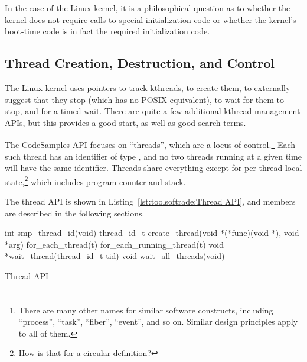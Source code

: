In the case of the Linux kernel, it is a philosophical question as to
whether the kernel does not require calls to special initialization
code or whether the kernel's boot-time code is in fact the required
initialization code.

\subsection{Thread Creation, Destruction, and Control}
\label{sec:toolsoftrade:Thread Creation, Destruction, and Control}

The Linux kernel uses
 pointers to track kthreads,
 to create them,
 to externally suggest that they stop
(which has no POSIX equivalent),
 to wait for them to stop, and
 for a timed wait.
There are quite a few additional kthread-management APIs, but this
provides a good start, as well as good search terms.

The CodeSamples API focuses on ``threads'', which are a locus of
control.\footnote{
	There are many other names for similar software constructs, including
	``process'', ``task'', ``fiber'', ``event'', and so on.
	Similar design principles apply to all of them.}
Each such thread has an identifier of type ,
and no two threads running at a given time will have the same
identifier.
Threads share everything except for per-thread local state,\footnote{
	How is that for a circular definition?}
which includes program counter and stack.

The thread API is shown in
Listing~\ref{lst:toolsoftrade:Thread API}, and members are described in the
following sections.

\begin{listing}[tbp]
\begin{VerbatimL}[numbers=none,xleftmargin=2pt]
int smp_thread_id(void)
thread_id_t create_thread(void *(*func)(void *), void *arg)
for_each_thread(t)
for_each_running_thread(t)
void *wait_thread(thread_id_t tid)
void wait_all_threads(void)
\end{VerbatimL}
\caption{Thread API}
\label{lst:toolsoftrade:Thread API}
\end{listing}

\subsubsection{}

